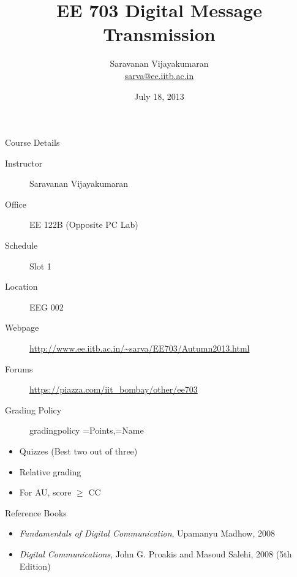 \documentclass[t]{beamer}
\title[EE 703 DMT]{EE 703 Digital Message Transmission}
\author[Saravanan V]
{
  Saravanan Vijayakumaran\\
  \href{mailto:sarva@ee.iitb.ac.in}{sarva@ee.iitb.ac.in}
}
\institute[IIT Bombay]
{
  Department of Electrical Engineering\\
  Indian Institute of Technology Bombay
}
\date{July 18, 2013}
\begin{document}
\begin{frame}
  \titlepage
\end{frame}

\begin{frame}{Course Details}
  \begin{description}
    \item[Instructor] Saravanan Vijayakumaran
    \item[Office] EE 122B (Opposite PC Lab)
    \item[Schedule] Slot 1
    \item[Location] EEG 002
    \item[Webpage] \url{http://www.ee.iitb.ac.in/~sarva/EE703/Autumn2013.html}
    \item[Forums] \url{https://piazza.com/iit_bombay/other/ee703}
  \end{description}
\end{frame}


\begin{frame}{Grading Policy}
  \begin{figure}
  \centering
  \setcounter{DTLpieroundvar}{0}
              {gradingpolicy}
              {\points=Points,\name=Name}
  \end{figure}

  \begin{itemize}
    \item Quizzes (Best two out of three)
    \item Relative grading
    \item For AU, score $\geq$ CC
  \end{itemize}
\end{frame}

\begin{frame}{Reference Books}
  \begin{itemize}
    
    \item \textit{Fundamentals of Digital Communication}, Upamanyu Madhow, 2008
    \item \textit{Digital Communications}, John G. Proakis and Masoud Salehi, 2008 (5th Edition)
  \end{itemize}
\end{frame}
\end{document}
